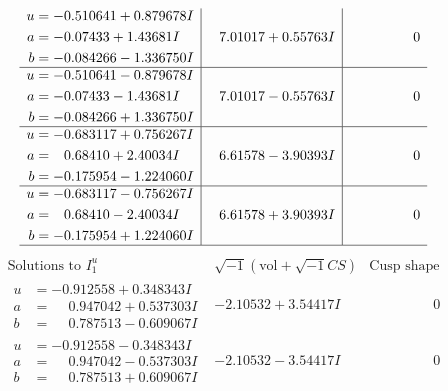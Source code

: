 \documentclass[1p]{elsarticle_modified}
\theoremstyle{definition}
\newcommand{\I}{\sqrt{-1}}
\begin{document}
$$\begin{array}{c|c|c}
\begin{aligned}
u &= -0.510641 + 0.879678 I \\
a &= -0.07433 + 1.43681 I \\
b &= -0.084266 - 1.336750 I\end{aligned}
 & \phantom{-}7.01017 + 0.55763 I & \phantom{-0.000000 } 0 \\ \hline\begin{aligned}
u &= -0.510641 - 0.879678 I \\
a &= -0.07433 - 1.43681 I \\
b &= -0.084266 + 1.336750 I\end{aligned}
 & \phantom{-}7.01017 - 0.55763 I & \phantom{-0.000000 } 0 \\ \hline\begin{aligned}
u &= -0.683117 + 0.756267 I \\
a &= \phantom{-}0.68410 + 2.40034 I \\
b &= -0.175954 - 1.224060 I\end{aligned}
 & \phantom{-}6.61578 - 3.90393 I & \phantom{-0.000000 } 0 \\ \hline\begin{aligned}
u &= -0.683117 - 0.756267 I \\
a &= \phantom{-}0.68410 - 2.40034 I \\
b &= -0.175954 + 1.224060 I\end{aligned}
 & \phantom{-}6.61578 + 3.90393 I & \phantom{-0.000000 } 0\\
 \hline 
 \end{array}$$\newpage$$\begin{array}{c|c|c}  
\text{Solutions to }I^u_{1}& \I (\text{vol} + \sqrt{-1}CS) & \text{Cusp shape}\\
 \hline 
\begin{aligned}
u &= -0.912558 + 0.348343 I \\
a &= \phantom{-}0.947042 + 0.537303 I \\
b &= \phantom{-}0.787513 - 0.609067 I\end{aligned}
 & -2.10532 + 3.54417 I & \phantom{-0.000000 } 0 \\ \hline\begin{aligned}
u &= -0.912558 - 0.348343 I \\
a &= \phantom{-}0.947042 - 0.537303 I \\
b &= \phantom{-}0.787513 + 0.609067 I\end{aligned}
 & -2.10532 - 3.54417 I & \phantom{-0.000000 } 0 \\ \hline\begin{aligned}

\end{aligned}
\end{array}$$
\end{document}
